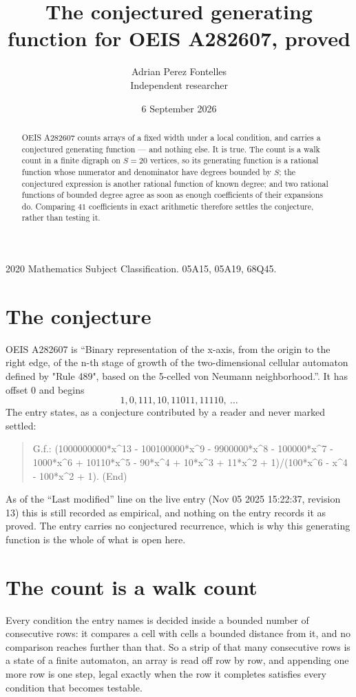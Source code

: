 \documentclass[11pt,a4paper]{article}
\title{The conjectured generating function for OEIS A282607, proved}
\author{Adrian Perez Fontelles\\ \small Independent researcher}
\date{6 September 2026}
\theoremstyle{plain}
\theoremstyle{definition}
\begin{document}
\maketitle

\begin{abstract}
OEIS A282607 counts arrays of a fixed width under a local condition, and carries a conjectured
generating function --- and nothing else. It is true. The count is a walk count in a finite
digraph on $S=20$ vertices, so its generating function is a rational function whose numerator
and denominator have degrees bounded by $S$; the conjectured expression is another rational
function of known degree; and two rational functions of bounded degree agree as soon as enough
coefficients of their expansions do. Comparing $41$ coefficients in exact arithmetic
therefore settles the conjecture, rather than testing it.
\end{abstract}

\noindent\small 2020 Mathematics Subject Classification. 05A15, 05A19, 68Q45.\normalsize

\section{The conjecture}

OEIS A282607 is ``Binary representation of the x-axis, from the origin to the right edge, of the n-th stage of growth of the two-dimensional cellular automaton defined by "Rule 489", based on the 5-celled von Neumann neighborhood.''. It has offset $0$ and begins
\[
1, 0, 111, 10, 11011, 11110,\ \dots
\]
The entry states, as a conjecture contributed by a reader and never marked settled:
\begin{quote}
G.f.: (1000000000*x\^{}13 - 100100000*x\^{}9 - 9900000*x\^{}8 - 100000*x\^{}7 - 1000*x\^{}6 + 10110*x\^{}5 - 90*x\^{}4 + 10*x\^{}3 + 11*x\^{}2 + 1)/(100*x\^{}6 - x\^{}4 - 100*x\^{}2 + 1). (End)
\end{quote}
As of the ``Last modified'' line on the live entry (Nov 05 2025 15:22:37, revision 13) this is still
recorded as empirical, and nothing on the entry records it as proved. The entry carries no
conjectured recurrence, which is why this generating function is the whole of what is open
here.

\section{The count is a walk count}

Every condition the entry names is decided inside a bounded number of consecutive rows: it
compares a cell with cells a bounded distance from it, and no comparison reaches further than
that. So a strip of that many consecutive rows is a state of a finite automaton, an array is
read off row by row, and appending one more row is one step, legal exactly when the row it
completes satisfies every condition that becomes testable.
\end{document}

